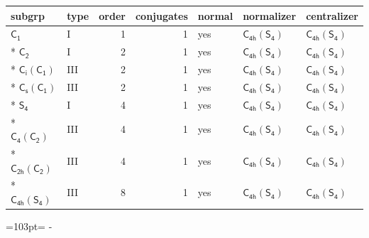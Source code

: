 \documentclass[10pt,a4paper]{article}
\newcommand{\needspace}[1]{\par\penalty-100\begingroup\dimen0=#1\relax\dimen2=\pagegoal
  \advance\dimen2-\pagetotal\ifdim\dimen0>\dimen2\relax\ifdim\dimen2>0pt\vfil\break\fi\fi
  \endgroup}
\numberwithin{equation}{section}
\newcommand{\grp}[1]{\mathsf{#1}}
\begin{document}
{\small\begin{longtable}{@{}llrrlll@{}}\toprule
subgrp & type & order & conjugates & normal & normalizer & centralizer\\\midrule\endhead
\bottomrule\endfoot\endlastfoot
\href{../../../rotation/data/pdf/C1.pdf}{$\grp{C_{1}}$} & I & 1 & 1 & yes & \href{C4h-S4.pdf}{$\grp{C_{4h}}(\grp{S_{4}})$} & \href{C4h-S4.pdf}{$\grp{C_{4h}}(\grp{S_{4}})$}\\*
\href{../../../rotation/data/pdf/C2.pdf}{$\grp{C_{2}}$} & I & 2 & 1 & yes & \href{C4h-S4.pdf}{$\grp{C_{4h}}(\grp{S_{4}})$} & \href{C4h-S4.pdf}{$\grp{C_{4h}}(\grp{S_{4}})$}\\*
\href{S2-C1.pdf}{$\grp{C_{i}}(\grp{C_{1}})$} & III & 2 & 1 & yes & \href{C4h-S4.pdf}{$\grp{C_{4h}}(\grp{S_{4}})$} & \href{C4h-S4.pdf}{$\grp{C_{4h}}(\grp{S_{4}})$}\\*
\href{C1v-C1.pdf}{$\grp{C_{s}}(\grp{C_{1}})$} & III & 2 & 1 & yes & \href{C4h-S4.pdf}{$\grp{C_{4h}}(\grp{S_{4}})$} & \href{C4h-S4.pdf}{$\grp{C_{4h}}(\grp{S_{4}})$}\\*
\href{../../../rotation/data/pdf/S4.pdf}{$\grp{S_{4}}$} & I & 4 & 1 & yes & \href{C4h-S4.pdf}{$\grp{C_{4h}}(\grp{S_{4}})$} & \href{C4h-S4.pdf}{$\grp{C_{4h}}(\grp{S_{4}})$}\\*
\href{C4-C2.pdf}{$\grp{C_{4}}(\grp{C_{2}})$} & III & 4 & 1 & yes & \href{C4h-S4.pdf}{$\grp{C_{4h}}(\grp{S_{4}})$} & \href{C4h-S4.pdf}{$\grp{C_{4h}}(\grp{S_{4}})$}\\*
\href{C2h-C2.pdf}{$\grp{C_{2h}}(\grp{C_{2}})$} & III & 4 & 1 & yes & \href{C4h-S4.pdf}{$\grp{C_{4h}}(\grp{S_{4}})$} & \href{C4h-S4.pdf}{$\grp{C_{4h}}(\grp{S_{4}})$}\\*
\href{C4h-S4.pdf}{$\grp{C_{4h}}(\grp{S_{4}})$} & III & 8 & 1 & yes & \href{C4h-S4.pdf}{$\grp{C_{4h}}(\grp{S_{4}})$} & \href{C4h-S4.pdf}{$\grp{C_{4h}}(\grp{S_{4}})$}\\
\bottomrule\end{longtable}}
\needspace{103pt}
\end{document}
